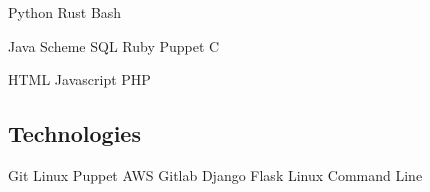 \documentclass[letterpaper]{deedy-resume} %
\newcommand{\bul}{\textbullet{}}
\begin{document}
\begin{minipage}[t]{0.33\textwidth}

Python \bul Rust \bul Bash


Java \bul Scheme \bul SQL \bul Ruby \bul Puppet \bul C


HTML \bul Javascript \bul PHP

\sectionspace %

\subsection{Technologies}

Git \bul Linux \bul Puppet \bul AWS \bul Gitlab \bul Django \bul Flask
\bul Linux Command Line


\end{minipage} %
\hfill
%
%
\end{document}
